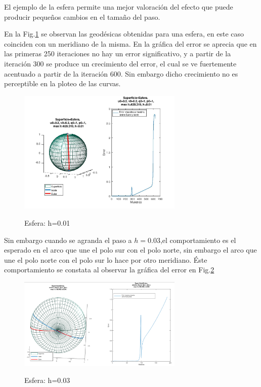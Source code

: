 \documentclass{endm}
\begin{document}
El ejemplo de la esfera permite una mejor valoraci\'on del efecto que puede producir peque\~nos cambios en el tama\~no del paso. 

En la Fig.\ref{fig:esfera} se observan las geod\'esicas obtenidas para una esfera, en este caso coinciden con un meridiano\cite{bib:vascos} de la misma. En la gr\'afica del error se aprecia que en las primeras 250 iteraciones no hay un error significativo, y a partir de la iteraci\'on 300 se produce un crecimiento del error, el cual se ve fuertemente acentuado a partir de la iteraci\'on 600. Sin embargo dicho crecimiento no es perceptible en la ploteo de las curvas.
\begin{figure}[H]
\caption{Esfera: h=0.01}
\centering
\includegraphics[width=0.7\textwidth]{esfera.jpg}
\label{fig:esfera}
\end{figure}

Sin embargo cuando se agranda el paso a $h=0.03$,el comportamiento es el esperado en el arco que une el polo sur con el polo norte, sin embargo el arco que une el polo norte con el polo sur lo hace por otro meridiano. \'Este comportamiento se constata al observar la gr\'afica del error en Fig.\ref{fig:esferarara}

\begin{figure}[H]
\caption{Esfera: h=0.03 }
\centering
\includegraphics[width=0.7\textwidth]{esferarara.png}
\label{fig:esferarara}
\end{figure}


\tableofcontents
\end{document}

